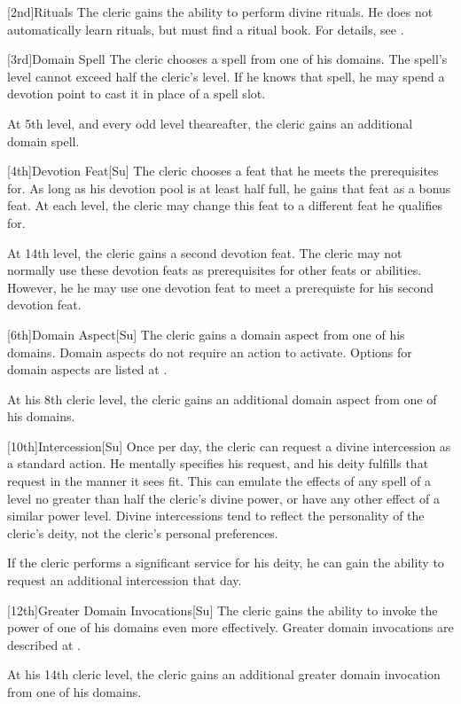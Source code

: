 [2nd]{Rituals}
The cleric gains the ability to perform divine rituals.
He does not automatically learn rituals, but must find a ritual book.
For details, see .

[3rd]{Domain Spell}
The cleric chooses a spell from one of his domains.
The spell's level cannot exceed half the cleric's level.
If he knows that spell, he may spend a devotion point to cast it in place of a spell slot.

At 5th level, and every odd level theareafter, the cleric gains an additional domain spell.

[4th]{Devotion Feat}[Su]
The cleric chooses a feat that he meets the prerequisites for.
As long as his devotion pool is at least half full, he gains that feat as a bonus feat.
At each level, the cleric may change this feat to a different feat he qualifies for.

At 14th level, the cleric gains a second devotion feat.
The cleric may not normally use these devotion feats as prerequisites for other feats or abilities.
However, he he may use one devotion feat to meet a prerequiste for his second devotion feat.

[6th]{Domain Aspect}[Su]
The cleric gains a domain aspect from one of his domains.
Domain aspects do not require an action to activate.
Options for domain aspects are listed at .

At his 8th cleric level, the cleric gains an additional domain aspect from one of his domains.

[10th]{Intercession}[Su]
Once per day, the cleric can request a divine intercession as a standard action.
He mentally specifies his request, and his deity fulfills that request in the manner it sees fit.
This can emulate the effects of any spell of a level no greater than half the cleric's divine power, or have any other effect of a similar power level.
Divine intercessions tend to reflect the personality of the cleric's deity, not the cleric's personal preferences.

If the cleric performs a significant service for his deity, he can gain the ability to request an additional intercession that day.

[12th]{Greater Domain Invocations}[Su]
The cleric gains the ability to invoke the power of one of his domains even more effectively.
Greater domain invocations are described at .

At his 14th cleric level, the cleric gains an additional greater domain invocation from one of his domains.

